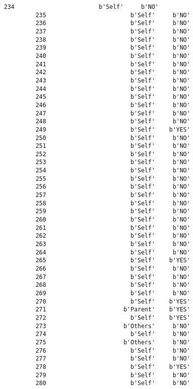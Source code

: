 \documentclass[11pt]{article}
\begin{document}
\begin{Verbatim}[commandchars=\\\{\}]
         234                        b'Self'     b'NO'  
         235                        b'Self'     b'NO'  
         236                        b'Self'     b'NO'  
         237                        b'Self'     b'NO'  
         238                        b'Self'     b'NO'  
         239                        b'Self'     b'NO'  
         240                        b'Self'     b'NO'  
         241                        b'Self'     b'NO'  
         242                        b'Self'     b'NO'  
         243                        b'Self'     b'NO'  
         244                        b'Self'     b'NO'  
         245                        b'Self'     b'NO'  
         246                        b'Self'     b'NO'  
         247                        b'Self'     b'NO'  
         248                        b'Self'     b'NO'  
         249                        b'Self'    b'YES'  
         250                        b'Self'     b'NO'  
         251                        b'Self'     b'NO'  
         252                        b'Self'     b'NO'  
         253                        b'Self'     b'NO'  
         254                        b'Self'     b'NO'  
         255                        b'Self'     b'NO'  
         256                        b'Self'     b'NO'  
         257                        b'Self'     b'NO'  
         258                        b'Self'     b'NO'  
         259                        b'Self'     b'NO'  
         260                        b'Self'     b'NO'  
         261                        b'Self'     b'NO'  
         262                        b'Self'     b'NO'  
         263                        b'Self'     b'NO'  
         264                        b'Self'     b'NO'  
         265                        b'Self'    b'YES'  
         266                        b'Self'     b'NO'  
         267                        b'Self'     b'NO'  
         268                        b'Self'     b'NO'  
         269                        b'Self'     b'NO'  
         270                        b'Self'    b'YES'  
         271                      b'Parent'    b'YES'  
         272                        b'Self'    b'YES'  
         273                      b'Others'     b'NO'  
         274                        b'Self'     b'NO'  
         275                      b'Others'     b'NO'  
         276                        b'Self'     b'NO'  
         277                        b'Self'     b'NO'  
         278                        b'Self'    b'YES'  
         279                        b'Self'     b'NO'  
         280                        b'Self'     b'NO'  

\end{Verbatim}
\end{document}
